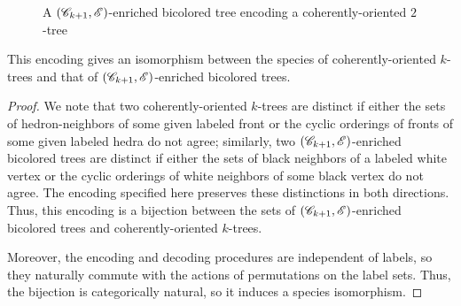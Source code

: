\documentclass[sectionflow,singlespace,twoside,boldmathhdr]{brandiss} %
\numberwithin{section}{chapter}
\numberwithin{figure}{chapter}
\begin{document}
\begin{figure}[htb]
  \centering
  \caption{A $\left( {\mathscr{C}_{k+1}, \mathscr{E}} \right)$-enriched bicolored tree encoding a coherently-oriented $2$-tree}
  \label{fig:exbctree}
\end{figure}

\begin{theorem}\label{thm:bctreeenc}
  This encoding gives an isomorphism between the species of coherently-oriented $k$-trees and that of $\left( {\mathscr{C}_{k+1}, \mathscr{E}} \right)$-enriched bicolored trees.
\end{theorem}

\begin{proof}
  We note that two coherently-oriented $k$-trees are distinct if either the sets of hedron-neighbors of some given labeled front or the cyclic orderings of fronts of some given labeled hedra do not agree; similarly, two $\left( {\mathscr{C}_{k+1}, \mathscr{E}} \right)$-enriched bicolored trees are distinct if either the sets of black neighbors of a labeled white vertex or the cyclic orderings of white neighbors of some black vertex do not agree.
  The encoding specified here preserves these distinctions in both directions.
  Thus, this encoding is a bijection between the sets of $\left( {\mathscr{C}_{k+1}, \mathscr{E}} \right)$-enriched bicolored trees and coherently-oriented $k$-trees.

  Moreover, the encoding and decoding procedures are independent of labels, so they naturally commute with the actions of permutations on the label sets.
  Thus, the bijection is categorically natural, so it induces a species isomorphism.
\end{proof}
\end{document}
